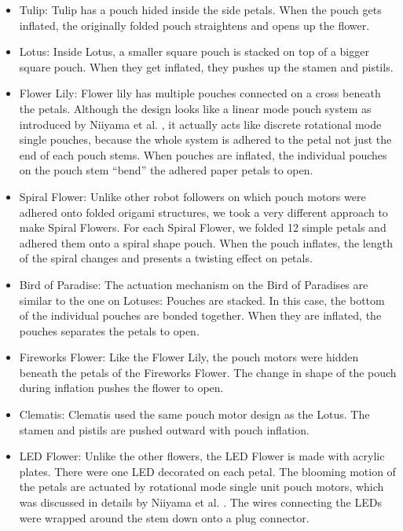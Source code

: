 \documentclass[letterpaper, 10 pt, conference]{ieeeconf}  %
\begin{document}
\begin{itemize}
	
	\item Tulip: Tulip has a pouch hided inside the side petals. When the pouch gets inflated, the originally folded pouch straightens and opens up the flower.
	\item Lotus: Inside Lotus, a smaller square pouch is stacked on top of a bigger square pouch. When they get inflated, they pushes up the stamen and pistils.
	\item Flower Lily: Flower lily has multiple pouches connected on a cross beneath the petals. Although the design looks like a linear mode pouch system as introduced by Niiyama et al. \cite{NiiyamaICRA2014}, it actually acts like discrete rotational mode single pouches, because the whole system is adhered to the petal not just the end of each pouch stems. When pouches are inflated, the individual pouches on the pouch stem ``bend'' the adhered paper petals to open.
	\item Spiral Flower: Unlike other robot followers on which pouch motors were adhered onto folded origami structures, we took a very different approach to make Spiral Flowers. For each Spiral Flower, we folded 12 simple petals and adhered them onto a spiral shape pouch. When the pouch inflates, the length of the spiral changes and presents a twisting effect on petals.
	\item Bird of Paradise: The actuation mechanism on the Bird of Paradises are similar to the one on Lotuses: Pouches are stacked. In this case, the bottom of the individual pouches are bonded together. When they are inflated, the pouches separates the petals to open.
	\item Fireworks Flower:  Like the Flower Lily, the pouch motors were hidden beneath the petals of the Fireworks Flower. The change in shape of the pouch during inflation pushes the flower to open.
	\item Clematis: Clematis used the same pouch motor design as the Lotus. The stamen and pistils are pushed outward with pouch inflation.
	\item LED Flower: Unlike the other flowers, the LED Flower is made with acrylic plates. There were one LED decorated on each petal. The blooming motion of the petals are actuated by rotational mode single unit pouch motors, which was discussed in details by Niiyama et al. \cite{NiiyamaICRA2014}. The wires connecting the LEDs were wrapped around the stem down onto a plug connector. 
	
\end{itemize}
\end{document}
